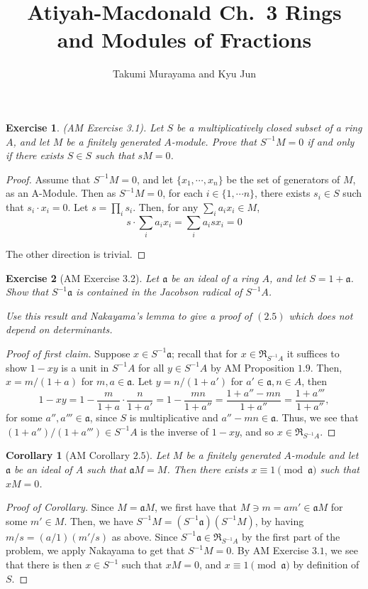 \documentclass[12pt,letterpaper]{article}
\title{Atiyah-Macdonald Ch.~3 Rings and Modules of Fractions}
\author{Takumi Murayama and Kyu Jun}
\newtheorem{problem}{Exercise}[section]
\newtheorem{corollary}{Corollary}
\theoremstyle{definition}
\theoremstyle{remark}
\numberwithin{figure}{problem}
\numberwithin{equation}{section}
\begin{document}
\maketitle
\setcounter{section}{3}
\begin{problem}(AM Exercise 3.1). Let $S$ be a multiplicatively closed subset of a ring $A$, and let $M$ be a finitely generated $A$-module. Prove that $S^{-1}M = 0$ if and only if there exists $S \in S$ such that $sM = 0$. 
\end{problem}
\begin{proof}
Assume that $S^{-1}M = 0$, and let $\{x_1, \cdots, x_n\}$ be the set of generators of $M$, as an A-Module. Then as $S^{-1}M = 0$, for each $i \in \{1, \cdots n\}$, there exists $s_i \in S$ such that $s_i \cdot x_i=0$. Let $s= \prod_{i} s_i$. Then, for any $\sum_{i}a_ix_i \in M$, $$s \cdot \sum_{i}a_ix_i = \sum_{i}a_isx_i = 0$$

The other direction is trivial. 

\end{proof}

\begin{problem}[AM Exercise 3.2]
  Let $\mathfrak{a}$ be an ideal of a ring $A$, and let $S = 1 + \mathfrak{a}$. Show that $S^{-1}\mathfrak{a}$ is contained in the Jacobson radical of $S^{-1}A$.
  \par Use this result and Nakayama's lemma to give a proof of $(2.5)$ which does not depend on determinants.
\end{problem}
\begin{proof}[Proof of first claim]
  Suppose $x \in S^{-1}\mathfrak{a}$; recall that for $x \in \mathfrak{R}_{S^{-1}A}$ it suffices to show $1-xy$ is a unit in $S^{-1}A$ for all $y \in S^{-1}A$ by AM Proposition $1.9$. Then, $x = m/(1+a)$ for $m,a \in \mathfrak{a}$. Let $y = n/(1+a')$ for $a' \in \mathfrak{a},n \in A$, then
  \begin{equation*}
    1 - xy = 1 - \frac{m}{1+a} \cdot \frac{n}{1+a'} = 1 - \frac{mn}{1+a''} = \frac{1 + a''-mn}{1+a''} = \frac{1 + a'''}{1+a''},
  \end{equation*}
  for some $a'',a''' \in \mathfrak{a}$, since $S$ is multiplicative and $a''-mn \in \mathfrak{a}$. Thus, we see that $(1+a'')/(1+a''') \in S^{-1}A$ is the inverse of $1-xy$, and so $x \in \mathfrak{R}_{S^{-1}A}$.
\end{proof}
\begin{corollary}[AM Corollary $2.5$]
  Let $M$ be a finitely generated $A$-module and let $\mathfrak{a}$ be an ideal of $A$ such that $\mathfrak{a}M = M$. Then there exists $x \equiv 1\pmod{\mathfrak{a}}$ such that $xM = 0$.
\end{corollary}
\begin{proof}[Proof of Corollary]
  Since $M = \mathfrak{a}M$, we first have that $M \ni m = am' \in \mathfrak{a}M$ for some $m' \in M$. Then, we have $S^{-1}M = (S^{-1}\mathfrak{a})(S^{-1}M)$, by having $m/s = (a/1)(m'/s)$ as above. Since $S^{-1}\mathfrak{a} \in \mathfrak{R}_{S^{-1}A}$ by the first part of the problem, we apply Nakayama to get that $S^{-1}M = 0$. By AM Exercise $3.1$, we see that there is then $x \in S^{-1}$ such that $xM = 0$, and $x \equiv 1 \pmod{\mathfrak{a}}$ by definition of $S$.
\end{proof}
\end{document}
